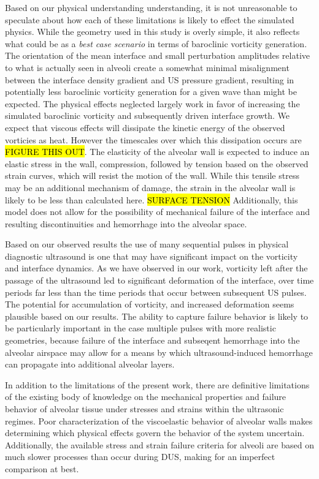 Based on our physical understanding understanding, it is not
unreasonable to speculate about how each of these limitations is
likely to effect the simulated physics. While the geometry used in
this study is overly simple, it also reflects what could be as a
\textit{best case scenario} in terms of baroclinic vorticity
generation. The orientation of the mean interface and small
perturbation amplitudes relative to what is actually seen in alveoli
create a somewhat minimal misalignment between the interface density
gradient and \ac{US} pressure gradient, resulting in potentially less
baroclinic vorticity generation for a given wave than might be
expected. The physical effects neglected largely work in favor of
increasing the simulated baroclinic vorticity and subsequently driven
interface growth. We expect that viscous effects will dissipate the
kinetic energy of the observed vorticies as heat. However the
timescales over which this dissipation occurs are \hl{FIGURE THIS
  OUT}. The elasticity of the alveolar wall is expected to induce an
elastic stress in the wall, compression, followed by tension based on
the observed strain curves, which will resist the motion of the
wall. While this tensile stress may be an additional mechanism of
damage, the strain in the alveolar wall is likely to be less than
calculated here. \hl{SURFACE TENSION} Additionally, this model does not allow for the
possibility of mechanical failure of the interface and resulting
discontinuities and hemorrhage into the alveolar space. 

Based on our observed results the use of many sequential pulses in
physical diagnostic ultrasound is one that may have significant impact
on the vorticity and interface dynamics. As we have observed in our
work, vorticity left after the passage of the ultrasound led to
significant deformation of the interface, over time periods far less
than the time periods that occur between subsequent \ac{US}
pulses. The potential for accumulation of vorticity, and increased
deformation seems plausible based on our results. The ability to
capture failure behavior is likely to be particularly important in the
case multiple pulses with more realistic geometries, because failure
of the interface and subseqent hemorrhage into the alveolar airspace
may allow for a means by which ultrasound-induced hemorrhage can
propagate into additional alveolar layers.

In addition to the limitations of the present work, there are
definitive limitations of the existing body of knowledge on the
mechanical properties and failure behavior of alveolar tissue under
stresses and strains within the ultrasonic regimes. Poor
characterization of the viscoelastic behavior of alveolar walls makes
determining which physical effects govern the behavior of the system
uncertain. Additionally, the available stress and strain failure
criteria for alveoli are based on much slower processes than occur
during \ac{DUS}, making for an imperfect comparison at best.

